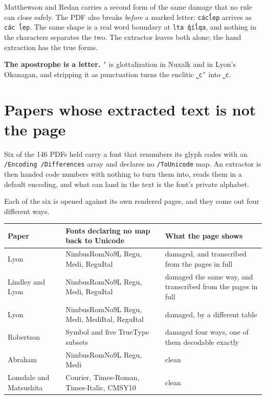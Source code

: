 Matthewson and Redan carries a second form of the same damage that no rule can close safely. The PDF also breaks \emph{before} a marked letter: \texttt{cácl̓ep} arrives as \texttt{các l̓ep}. The same shape is a real word boundary at \texttt{lta q̓íl̓qa}, and nothing in the characters separates the two. The extractor leaves both alone; the hand extraction has the true forms.

\textbf{The apostrophe is a letter.} \texttt{’} is glottalization in Nuxalk and in Lyon's Okanagan, and stripping it as punctuation turns the enclitic \texttt{˽c’} into \texttt{˽c}.

\section{Papers whose extracted text is not the page}

Six of the 146 PDFs held carry a font that renumbers its glyph codes with an \texttt{/Encoding /Differences} array and declares no \texttt{/ToUnicode} map. An extractor is then handed code numbers with nothing to turn them into, reads them in a default encoding, and what can land in the text is the font's private alphabet.

Each of the six is opened against its own rendered pages, and they come out four different ways.

\tiny
\setlength{\tabcolsep}{2pt}
\begin{longtable}{@{}>{\raggedright\arraybackslash}p{}>{\raggedright\arraybackslash}p{}>{\raggedright\arraybackslash}p{}@{}}
\toprule
Paper & Fonts declaring no map back to Unicode & What the page shows \\
\midrule
Lyon \cite{src:Lyon-2015} & NimbusRomNo9L Regu, Medi, ReguItal & damaged, and transcribed from the pages in full \\
Lindley and Lyon \cite{src:Lindley-and-Lyon-2013} & NimbusRomNo9L Regu, Medi, ReguItal & damaged the same way, and transcribed from the pages in full \\
Lyon \cite{src:Lyon-2014} & NimbusRomNo9L Regu, Medi, MediItal, ReguItal & damaged, by a different table \\
Robertson \cite{src:Robertson-2012} & Symbol and five TrueType subsets & damaged four ways, one of them decodable exactly \\
Abraham \cite{src:Abraham-2015} & NimbusRomNo9L Regu, Medi & clean \\
Lonsdale and Matsushita \cite{src:Lonsdale-and-Matsushita-2011} & Courier, Times-Roman, Times-Italic, CMSY10 & clean \\
\bottomrule
\end{longtable}
\normalsize

